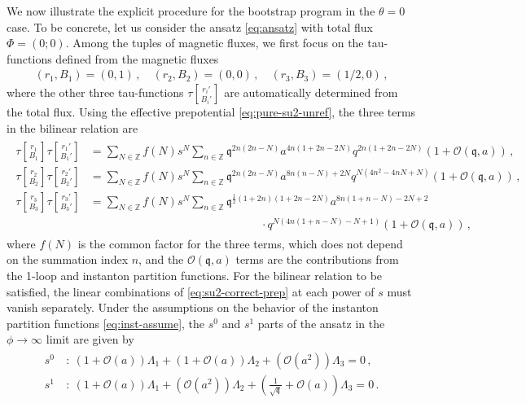 \documentclass[11pt, a4paper]{article}
\newcommand{\tauftn}[2]{\tau\genfrac[]{0pt}{1}{#1}{#2}}
\theoremstyle{definition}
\begin{document}
We now illustrate the explicit procedure for the bootstrap program in the $ \theta=0 $ case. To be concrete, let us consider the ansatz \eqref{eq:ansatz} with total flux $ \Phi=(0;0) $. Among the tuples of magnetic fluxes, we first focus on the tau-functions defined from the magnetic fluxes
\begin{align}\label{eq:su2-correct-flux-eg}
    (r_1,B_1) = (0, 1) \, , \quad
    (r_2,B_2) = (0, 0) \, , \quad
    (r_3,B_3) = (1/2, 0) \, ,
\end{align}
where the other three tau-functions $ \tauftn{r_i'}{B_i'} $ are automatically determined from the total flux. Using the effective prepotential \eqref{eq:pure-su2-unref}, the three terms in the bilinear relation are
\begin{align}
    \begin{aligned}\label{eq:su2-correct-prep}
        \tauftn{r_1}{B_1} \tauftn{r_1'}{B_1'} &= \sum_{N \in \mathbb{Z}} f(N) s^N \sum_{n\in \mathbb{Z}} \mathfrak{q}^{2n(2n-N)} a^{4n(1+2n-2N)} q^{2n(1+2n-2N)} (1+\mathcal{O}(\mathfrak{q},a)) \, , \\
        \tauftn{r_2}{B_2} \tauftn{r_2'}{B_2'} &= \sum_{N \in \mathbb{Z}} f(N) s^N \sum_{n\in \mathbb{Z}} \mathfrak{q}^{2n(2n-N)} a^{8n(n-N)+2N} q^{N(4n^2-4nN+N)} (1+\mathcal{O}(\mathfrak{q},a)) \, , \\
        \tauftn{r_3}{B_3} \tauftn{r_3'}{B_3'} &= \sum_{N \in \mathbb{Z}} f(N) s^N \sum_{n\in \mathbb{Z}} \mathfrak{q}^{\frac{1}{2}(1+2n)(1+2n-2N)} a^{8n(1+n-N)-2N+2} \\
        & \hspace{15em} \cdot q^{N(4n(1+n-N)-N+1)} (1+\mathcal{O}(\mathfrak{q},a)) \, ,
    \end{aligned}
\end{align}
where $ f(N) $ is the common factor for the three terms, which does not depend on the summation index $ n $, and the $ \mathcal{O}(\mathfrak{q},a) $ terms are the contributions from the 1-loop and instanton partition functions. For the bilinear relation to be satisfied, the linear combinations of \eqref{eq:su2-correct-prep} at each power of $ s $ must vanish separately. Under the assumptions on the behavior of the instanton partition functions \eqref{eq:inst-assume}, the $ s^0 $ and $ s^{1} $ parts of the ansatz in the $ \phi \to \infty $ limit are given by
\begin{align}
    \begin{aligned}
        s^0 \ &: \ \left(1 + \mathcal{O}(a)\right) \Lambda_1 + \left(1 + \mathcal{O}(a)\right) \Lambda_2 + \left(\mathcal{O}(a^2)\right) \Lambda_3 = 0 \, , \\
        s^1 \ &: \ \left(1 + \mathcal{O}(a)\right) \Lambda_1 + \left(\mathcal{O}(a^2)\right) \Lambda_2 + \left(\frac{1}{\sqrt{\mathfrak{q}}} + \mathcal{O}(a) \right) \Lambda_3 = 0 \, .
    \end{aligned}
\end{align}
\end{document}
